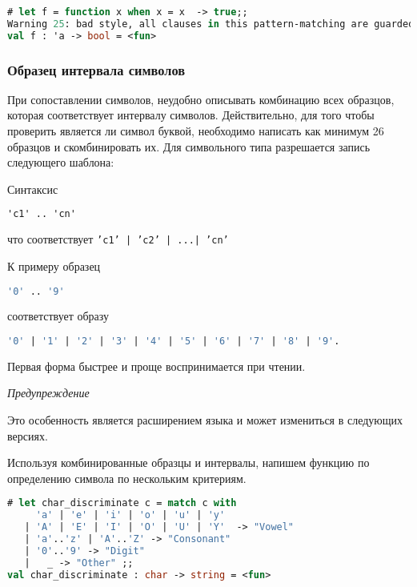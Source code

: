 \begin{lstlisting}[language=OCaml]
# let f = function x when x = x  -> true;;
Warning 25: bad style, all clauses in this pattern-matching are guarded.
val f : 'a -> bool = <fun>
\end{lstlisting}

\subsubsection{Образец интервала символов}

При сопоставлении символов, неудобно описывать комбинацию всех образцов, которая
соответствует интервалу символов. Действительно, для того чтобы проверить
является ли символ буквой, необходимо написать как минимум 26 образцов и
скомбинировать их. Для символьного типа разрешается запись следующего шаблона:

Синтаксис

\begin{lstlisting}[language=OCaml]
'c1' .. 'cn'
\end{lstlisting}

что соответствует \texttt{'c1' | 'c2' | ...| 'cn'}

К примеру образец

\begin{lstlisting}[language=OCaml]
'0' .. '9'
\end{lstlisting}

соответствует образу

\begin{lstlisting}[language=OCaml]
'0' | '1' | '2' | '3' | '4' | '5' | '6' | '7' | '8' | '9'.
\end{lstlisting}

Первая форма быстрее и проще воспринимается при чтении.

{\it Предупреждение}

Это особенность является расширением языка и может измениться в следующих
версиях.

Используя комбинированные образцы и интервалы, напишем функцию по определению
символа по нескольким критериям.

\begin{lstlisting}[language=OCaml]
# let char_discriminate c = match c with
     'a' | 'e' | 'i' | 'o' | 'u' | 'y'
   | 'A' | 'E' | 'I' | 'O' | 'U' | 'Y'  -> "Vowel"
   | 'a'..'z' | 'A'..'Z' -> "Consonant"
   | '0'..'9' -> "Digit"
   |   _ -> "Other" ;;
val char_discriminate : char -> string = <fun>
\end{lstlisting}

